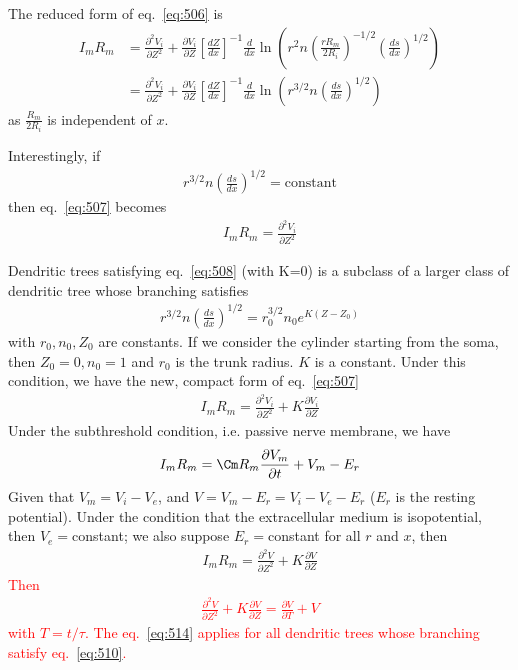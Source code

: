 The reduced form of eq.~\eqref{eq:506} is
\begin{equation}
  \label{eq:507}
  \begin{split}
    I_mR_m &= \frac{\partial^2 V_i}{\partial Z^2} +
    \frac{\partial V_i}{\partial Z}\left[\frac{dZ}{dx}\right]^{-1}
    \frac{d}{dx} \ln \left(
      r^2n\left(\frac{rR_m}{2R_i}\right)^{-1/2}\left(\frac{ds}{dx}\right)^{1/2}
    \right) \\
    &= \frac{\partial^2 V_i}{\partial Z^2} +
    \frac{\partial V_i}{\partial Z}\left[\frac{dZ}{dx}\right]^{-1}
    \frac{d}{dx} \ln \left( r^{3/2}n\left(\frac{ds}{dx}\right)^{1/2}
    \right)
  \end{split}
\end{equation}
as $\frac{R_m}{2R_i}$ is independent of $x$.

Interestingly, if
\begin{eqnarray}
  \label{eq:508}
  r^{3/2}n\left(\frac{ds}{dx}\right)^{1/2} = \text{constant}
\end{eqnarray}
then eq.~\eqref{eq:507} becomes
\begin{eqnarray}
  \label{eq:509}
  I_mR_m = \frac{\partial^2 V_i}{\partial Z^2} 
\end{eqnarray}

Dendritic trees satisfying eq.~\eqref{eq:508} (with K=0) is a subclass
of a larger class of dendritic tree whose branching satisfies
\begin{eqnarray}
  \label{eq:510}
  r^{3/2}n\left(\frac{ds}{dx}\right)^{1/2} = r_0^{3/2}n_0e^{K(Z-Z_0)}
\end{eqnarray}
with $r_0, n_0, Z_0$ are constants. If we consider the cylinder
starting from the soma, then $Z_0=0, n_0=1$ and $r_0$ is the trunk
radius. %
$K$ is a constant. Under this condition, we have the new, compact form
of eq.~\eqref{eq:507}
\begin{eqnarray}
  \label{eq:511}
  I_mR_m = \frac{\partial^2 V_i}{\partial Z^2} +
 K \frac{\partial V_i}{\partial Z}
\end{eqnarray}
Under the subthreshold condition, i.e. passive nerve membrane, we have
\begin{eqnarray}
  \label{eq:512}
  I_mR_m=\Cm R_m\frac{\partial V_m}{\partial t}+V_m-E_r
\end{eqnarray}
Given that $V_m=V_i-V_e$, and $V=V_m-E_r=V_i-V_e-E_r$ ($E_r$ is the
resting potential). Under the condition that the extracellular medium
is isopotential, then $V_e=$constant; we also suppose $E_r=$constant
for all $r$ and $x$, then
\begin{eqnarray}
  \label{eq:515}
   I_mR_m = \frac{\partial^2 V}{\partial Z^2} +
 K \frac{\partial V}{\partial Z}
\end{eqnarray}
\textcolor{red}{Then
\begin{eqnarray}
  \label{eq:514}
  \frac{\partial^2 V}{\partial Z^2} +
  K \frac{\partial V}{\partial Z} = \frac{\partial V}{\partial T} + V
\end{eqnarray}
with $T=t/\tau$. The eq.~\eqref{eq:514} applies for all dendritic
trees whose branching satisfy eq.~\eqref{eq:510}. }

